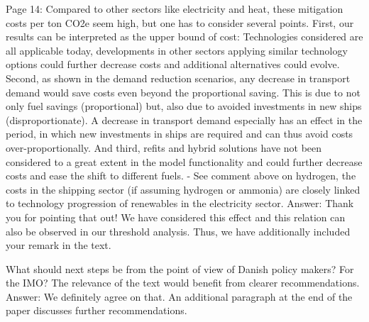 Page 14: Compared to other sectors like electricity and heat, these mitigation costs per ton CO2e seem high, but one has to consider several points. First, our results can be interpreted as the upper bound of cost: Technologies considered are all applicable today, developments in other sectors applying similar technology options could further decrease costs and additional alternatives could evolve. Second, as shown in the demand reduction scenarios, any decrease in transport demand would save costs even beyond the proportional saving. This is due to not only fuel savings (proportional) but, also due to avoided investments in new ships (disproportionate). A decrease in transport demand especially has an effect in the period, in which new investments in ships are required and can thus avoid costs over-proportionally. And third, refits and hybrid solutions have not been considered to a great extent in the model functionality and could further decrease costs and ease the shift to different fuels. 
-	See comment above on hydrogen, the costs in the shipping sector (if assuming hydrogen or ammonia) are closely linked to technology progression of renewables in the electricity sector.
Answer: Thank you for pointing that out! We have considered this effect and this relation can also be observed in our threshold analysis. Thus, we have additionally included your remark in the text.

What should next steps be from the point of view of Danish policy makers? For the IMO? The relevance of the text would benefit from clearer recommendations. 
Answer: We definitely agree on that. An additional paragraph at the end of the paper discusses further recommendations.



